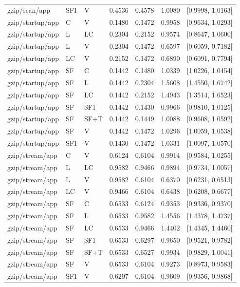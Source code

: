 \begin{longtable}{lllrrrr}
gzip/scan/app & SF1 & V & 0.4536 & 0.4578 & 1.0080 & [0.9998, 1.0163] \\
gzip/startup/app & C & V & 0.1480 & 0.1472 & 0.9958 & [0.9634, 1.0293] \\
gzip/startup/app & L & LC & 0.2304 & 0.2152 & 0.9574 & [0.8647, 1.0600] \\
gzip/startup/app & L & V & 0.2304 & 0.1472 & 0.6597 & [0.6059, 0.7182] \\
gzip/startup/app & LC & V & 0.2152 & 0.1472 & 0.6890 & [0.6091, 0.7794] \\
gzip/startup/app & SF & C & 0.1442 & 0.1480 & 1.0339 & [1.0226, 1.0454] \\
gzip/startup/app & SF & L & 0.1442 & 0.2304 & 1.5608 & [1.4550, 1.6742] \\
gzip/startup/app & SF & LC & 0.1442 & 0.2152 & 1.4943 & [1.3514, 1.6523] \\
gzip/startup/app & SF & SF1 & 0.1442 & 0.1430 & 0.9966 & [0.9810, 1.0125] \\
gzip/startup/app & SF & SF+T & 0.1442 & 0.1449 & 1.0088 & [0.9608, 1.0592] \\
gzip/startup/app & SF & V & 0.1442 & 0.1472 & 1.0296 & [1.0059, 1.0538] \\
gzip/startup/app & SF1 & V & 0.1430 & 0.1472 & 1.0331 & [1.0097, 1.0570] \\
gzip/stream/app & C & V & 0.6124 & 0.6104 & 0.9914 & [0.9584, 1.0255] \\
gzip/stream/app & L & LC & 0.9582 & 0.9466 & 0.9894 & [0.9734, 1.0057] \\
gzip/stream/app & L & V & 0.9582 & 0.6104 & 0.6370 & [0.6231, 0.6513] \\
gzip/stream/app & LC & V & 0.9466 & 0.6104 & 0.6438 & [0.6208, 0.6677] \\
gzip/stream/app & SF & C & 0.6533 & 0.6124 & 0.9353 & [0.9336, 0.9370] \\
gzip/stream/app & SF & L & 0.6533 & 0.9582 & 1.4556 & [1.4378, 1.4737] \\
gzip/stream/app & SF & LC & 0.6533 & 0.9466 & 1.4402 & [1.4345, 1.4460] \\
gzip/stream/app & SF & SF1 & 0.6533 & 0.6297 & 0.9650 & [0.9521, 0.9782] \\
gzip/stream/app & SF & SF+T & 0.6533 & 0.6527 & 0.9934 & [0.9829, 1.0041] \\
gzip/stream/app & SF & V & 0.6533 & 0.6104 & 0.9273 & [0.8973, 0.9583] \\
gzip/stream/app & SF1 & V & 0.6297 & 0.6104 & 0.9609 & [0.9356, 0.9868] \\

\end{longtable}
